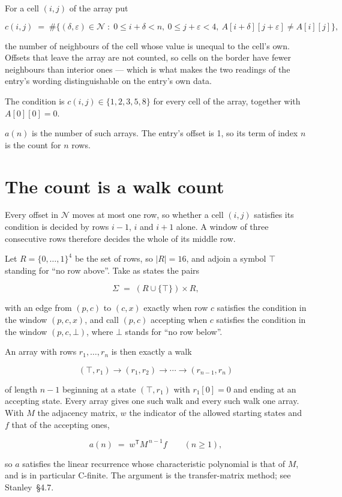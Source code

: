 \documentclass[11pt]{article}
\theoremstyle{definition}
\begin{document}
For a cell $(i,j)$ of the array put

\[c(i,j) \;=\; \#\bigl\{(\delta,\varepsilon)\in\mathcal{N} \;:\; 0\le i+\delta<n,\ 0\le j+\varepsilon<4,\ A[i+\delta][j+\varepsilon] \neq A[i][j]\bigr\},\]

the number of neighbours of the cell whose value is unequal to the cell's own. Offsets that leave the array are not counted, so cells on the border have fewer neighbours than interior ones --- which is what makes the two readings of the entry's wording distinguishable on the entry's own data.

The condition is $c(i,j) \in \{1, 2, 3, 5, 8\}$ for every cell of the array, together with $A[0][0]=0$.

$a(n)$ is the number of such arrays. The entry's offset is 1, so its term of index $n$ is the count for $n$ rows.

\section{The count is a walk count}

Every offset in $\mathcal{N}$ moves at most one row, so whether a cell $(i,j)$ satisfies its condition is decided by rows $i-1$, $i$ and $i+1$ alone. A window of three consecutive rows therefore decides the whole of its middle row.

Let $R = \{0,\dots,1\}^{4}$ be the set of rows, so $|R| = 16$, and adjoin a symbol $\top$ standing for ``no row above''. Take as states the pairs

\[\Sigma \;=\; (R \cup \{\top\}) \times R,\]

with an edge from $(p,c)$ to $(c,x)$ exactly when row $c$ satisfies the condition in the window $(p,c,x)$, and call $(p,c)$ accepting when $c$ satisfies the condition in the window $(p,c,\bot)$, where $\bot$ stands for ``no row below''.

An array with rows $r_1,\dots,r_n$ is then exactly a walk

\[(\top,r_1) \to (r_1,r_2) \to \cdots \to (r_{n-1},r_n)\]

of length $n-1$ beginning at a state $(\top,r_1)$ with $r_1[0]=0$ and ending at an accepting state. Every array gives one such walk and every such walk one array. With $M$ the adjacency matrix, $w$ the indicator of the allowed starting states and $f$ that of the accepting ones,

\[a(n) \;=\; w^{\mathsf T} M^{\,n-1} f \qquad (n \ge 1),\]

so $a$ satisfies the linear recurrence whose characteristic polynomial is that of $M$, and is in particular C-finite. The argument is the transfer-matrix method; see Stanley~\S4.7.
\end{document}

